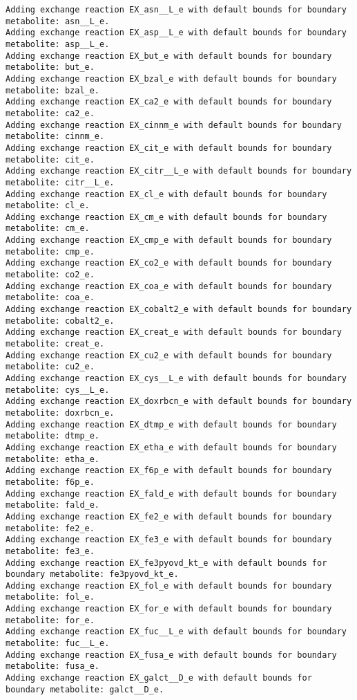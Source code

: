 \documentclass[
  letterpaper,
  DIV=11,
  numbers=noendperiod]{scrartcl}
\begin{document}
\begin{verbatim}
Adding exchange reaction EX_asn__L_e with default bounds for boundary metabolite: asn__L_e.
Adding exchange reaction EX_asp__L_e with default bounds for boundary metabolite: asp__L_e.
Adding exchange reaction EX_but_e with default bounds for boundary metabolite: but_e.
Adding exchange reaction EX_bzal_e with default bounds for boundary metabolite: bzal_e.
Adding exchange reaction EX_ca2_e with default bounds for boundary metabolite: ca2_e.
Adding exchange reaction EX_cinnm_e with default bounds for boundary metabolite: cinnm_e.
Adding exchange reaction EX_cit_e with default bounds for boundary metabolite: cit_e.
Adding exchange reaction EX_citr__L_e with default bounds for boundary metabolite: citr__L_e.
Adding exchange reaction EX_cl_e with default bounds for boundary metabolite: cl_e.
Adding exchange reaction EX_cm_e with default bounds for boundary metabolite: cm_e.
Adding exchange reaction EX_cmp_e with default bounds for boundary metabolite: cmp_e.
Adding exchange reaction EX_co2_e with default bounds for boundary metabolite: co2_e.
Adding exchange reaction EX_coa_e with default bounds for boundary metabolite: coa_e.
Adding exchange reaction EX_cobalt2_e with default bounds for boundary metabolite: cobalt2_e.
Adding exchange reaction EX_creat_e with default bounds for boundary metabolite: creat_e.
Adding exchange reaction EX_cu2_e with default bounds for boundary metabolite: cu2_e.
Adding exchange reaction EX_cys__L_e with default bounds for boundary metabolite: cys__L_e.
Adding exchange reaction EX_doxrbcn_e with default bounds for boundary metabolite: doxrbcn_e.
Adding exchange reaction EX_dtmp_e with default bounds for boundary metabolite: dtmp_e.
Adding exchange reaction EX_etha_e with default bounds for boundary metabolite: etha_e.
Adding exchange reaction EX_f6p_e with default bounds for boundary metabolite: f6p_e.
Adding exchange reaction EX_fald_e with default bounds for boundary metabolite: fald_e.
Adding exchange reaction EX_fe2_e with default bounds for boundary metabolite: fe2_e.
Adding exchange reaction EX_fe3_e with default bounds for boundary metabolite: fe3_e.
Adding exchange reaction EX_fe3pyovd_kt_e with default bounds for boundary metabolite: fe3pyovd_kt_e.
Adding exchange reaction EX_fol_e with default bounds for boundary metabolite: fol_e.
Adding exchange reaction EX_for_e with default bounds for boundary metabolite: for_e.
Adding exchange reaction EX_fuc__L_e with default bounds for boundary metabolite: fuc__L_e.
Adding exchange reaction EX_fusa_e with default bounds for boundary metabolite: fusa_e.
Adding exchange reaction EX_galct__D_e with default bounds for boundary metabolite: galct__D_e.

\end{verbatim}
\end{document}
